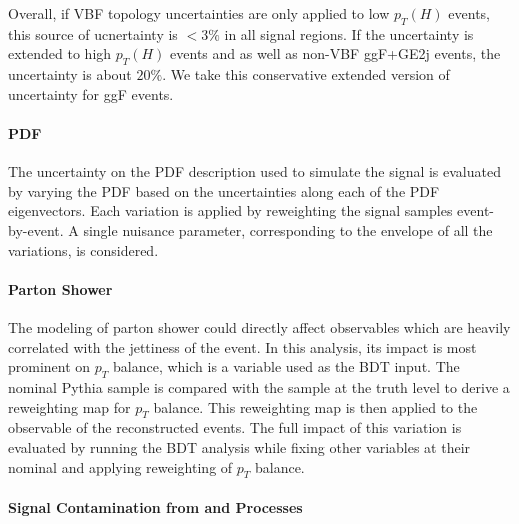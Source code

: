 Overall, if VBF topology uncertainties are only applied to low $p_T(H)$ events, this source 
of ucnertainty is $<3\%$ in all signal regions. If the uncertainty is extended to high $p_T(H)$ events and as well as non-VBF ggF+GE2j events, the uncertainty
is about $20\%$. We take this conservative extended version of uncertainty for ggF events.



\paragraph{PDF}
The uncertainty on the PDF description used to simulate the signal is evaluated
by varying the PDF based on the uncertainties along each of the PDF eigenvectors.
Each variation is applied by reweighting the signal samples event-by-event.
A single nuisance parameter, corresponding to the envelope of all the variations,
is considered.

\paragraph{Parton Shower}

The modeling of parton shower could directly affect observables which are heavily 
correlated with the jettiness of the event. In this analysis, its impact is most 
prominent on $p_{T}$ balance, which is a variable used as the BDT input. The nominal
Pythia sample is compared with the \herwig{} sample at the truth level to derive a 
reweighting map for $p_{T}$ balance.
This reweighting map is then applied to the observable of the reconstructed events. The full impact of this variation 
is evaluated by running the BDT analysis while fixing other variables at their nominal 
and applying reweighting of $p_{T}$ balance. 


\paragraph{Signal Contamination from \VH and \ttH Processes}

